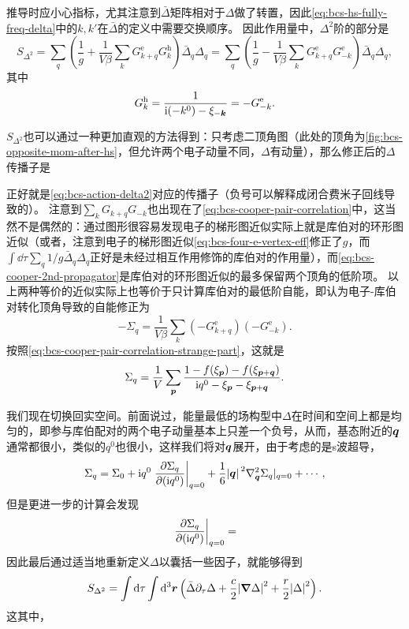 推导时应小心指标，尤其注意到$\bar{\Delta}$矩阵相对于$\Delta$做了转置，因此\eqref{eq:bcs-hs-fully-freq-delta}中的$k, k'$在$\bar{\Delta}$的定义中需要交换顺序。
因此作用量中，$\Delta^2$阶的部分是
\begin{equation}
    S_{\Delta^2} = \sum_{q} \left( \frac{1}{g} + \frac{1}{V \beta} \sum_k G^\text{e}_{k+q} G^\text{h}_k \right) \bar{\Delta}_{q} \Delta_{q} = \sum_{q} \left( \frac{1}{g} - \frac{1}{V \beta} \sum_k G^\text{e}_{k+q} G^\text{e}_{-k} \right) \bar{\Delta}_{q} \Delta_{q},
    \label{eq:bcs-action-delta2}
\end{equation}
其中
\begin{equation}
    G^\text{h}_{k} = \frac{1}{\mathrm{i}(- k^0) - \xi_{- \vb*{k}}} = - G^\text{e}_{-k}.
\end{equation}

$S_{\Delta^2}$也可以通过一种更加直观的方法得到：只考虑二顶角图（此处的顶角为\autoref{fig:bcs-opposite-mom-after-hs}，但允许两个电子动量不同，$\Delta$有动量），那么修正后的$\Delta$传播子是

正好就是\eqref{eq:bcs-action-delta2}对应的传播子（负号可以解释成闭合费米子回线导致的）。
注意到$\sum_{k} G_{k+q} G_{-k}$也出现在了\eqref{eq:bcs-cooper-pair-correlation}中，这当然不是偶然的：通过图形很容易发现电子的梯形图近似实际上就是库伯对的环形图近似（或者，注意到电子的梯形图近似\eqref{eq:bcs-four-e-vertex-eff}修正了$g$，而$\int \dd{\tau} \sum_q 1/g \bar{\Delta}_q \Delta_q$正好是未经过相互作用修饰的库伯对的作用量），而\eqref{eq:bcs-cooper-2nd-propagator}是库伯对的环形图近似的最多保留两个顶角的低阶项。
以上两种等价的近似实际上也等价于只计算库伯对的最低阶自能，即认为电子-库伯对转化顶角导致的自能修正为
\begin{equation}
    - \Sigma_q = \frac{1}{V \beta} \sum_{k} (- G^\text{e}_{k+q}) (- G^\text{e}_{-k}).
\end{equation}
按照\eqref{eq:bcs-cooper-pair-correlation-strange-part}，这就是
\begin{equation}
    \Sigma_q = \frac{1}{V} \sum_{\vb*{p}} \frac{1 - f(\xi_{\vb*{p}}) - f(\xi_{\vb*{p}+\vb*{q}})}{\mathrm{i} q^0 - \xi_{\vb*{p}} - \xi_{\vb*{p} + \vb*{q}}}.
\end{equation}

我们现在切换回实空间。前面说过，能量最低的场构型中$\Delta$在时间和空间上都是均匀的，即参与库伯配对的两个电子动量基本上只差一个负号，从而，基态附近的$\vb*{q}$通常都很小，类似的$q^0$也很小，这样我们将对$\vb*{q}$展开，由于考虑的是s波超导，
\[
    \Sigma_{q} = \Sigma_{0} + \ii q^0 \eval{\pdv{\Sigma_{q}}{(\ii q^0)}}_{q=0} + \frac{1}{6} \abs*{\vb*{q}}^2 \laplacian_{\vb*{q}} \Sigma_{q} |_{q=0} + \cdots,
\]
但是更进一步的计算会发现
\[
    \eval{\pdv{\Sigma_{q}}{(\ii q^0)}}_{q=0} = 
\]
因此最后通过适当地重新定义$\Delta$以囊括一些因子，就能够得到
\begin{equation}
    S_{\Delta^2} = \int \dd{\tau} \int \dd[3]{\vb*{r}} \left( \bar{\Delta} \partial_\tau \Delta + \frac{c}{2} \abs{\grad{\Delta}}^2 + \frac{r}{2} \abs{\Delta}^2 \right).
\end{equation}
这其中，

